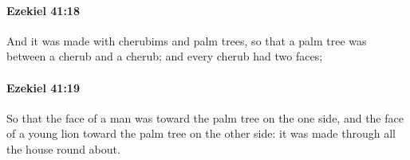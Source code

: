 		\paragraph{Ezekiel 41:18} %
			\label{EZEKIEL-41-18}

			And it was made with cherubims and palm trees, so that a palm tree was between a cherub and a cherub; and every cherub had two faces;


		\paragraph{Ezekiel 41:19} %
			\label{EZEKIEL-41-19}

			So that the face of a man was toward the palm tree on the one side, and the face of a young lion toward the palm tree on the other side: it was made through all the house round about.


